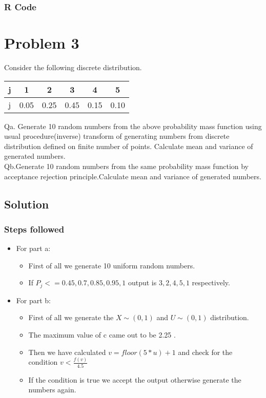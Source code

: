 \documentclass[10pt]{article}
\begin{document}
\subsubsection{R Code}


\pagebreak


\section{Problem 3}

Consider the following discrete distribution.
\begin{center}
\begin{tabular}{cccccc}
j &1 & 2 & 3 & 4 & 5 \\
\hline
j &0.05 & 0.25 & 0.45 & 0.15 & 0.10
\end{tabular}
\end{center}



Qa. Generate 10 random numbers from the above probability mass function using usual procedure(inverse) transform of generating numbers from discrete distribution defined on finite number of points. Calculate mean and variance of generated numbers.\\
Qb.Generate 10 random numbers from the same probability mass function by acceptance rejection principle.Calculate mean and variance of generated numbers.



\subsection{Solution}
\subsubsection{Steps followed}
\begin{itemize}
\item For part a:
\begin {itemize}
\item First of all we generate 10 uniform random numbers.
\item If $P_j <= 0.45 , 0.7 , 0.85 , 0.95 , 1$ output is $ 3 , 2 , 4 , 5 , 1 $ respectively.
\end{itemize}
\item For part b:
\begin {itemize}
\item First of all we generate the  $ X \sim  (0,1) $ and $ U \sim  (0,1) $ distribution.
\item The maximum value of c came out to be 2.25 .
\item Then we have calculated $v=floor(5*u)+1 $ and check for the condition $ v < \frac{f(v)}{4.5}$
\item If the condition is true we accept the output otherwise generate the numbers again.
\end{itemize}
\end{itemize}
\end{document}

